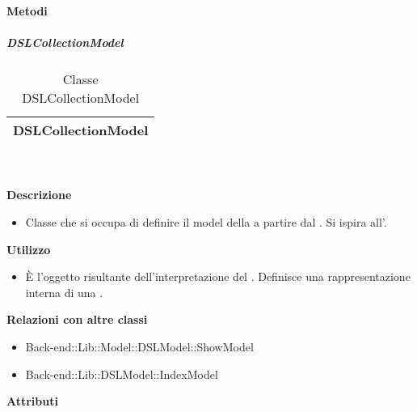 		\textbf{Metodi} 
	\begin{itemize}
		\end{itemize}
			\subparagraph{DSLCollectionModel} 
\begin{table}[ht]
\begin{center}
\bgroup
	\setlength{\arrayrulewidth}{0.6mm}
	\def\arraystretch{1}
		\begin{tabular}{ | p{12cm} | }
				\hline  
					\centerline{\textbf{DSLCollectionModel}}
		\\ \hline 
				\hline
				\hline
		
		\end{tabular}
\egroup
\caption{Classe DSLCollectionModel}
\end{center}
\end{table}  \textbf{\\ \\ Descrizione} 
					\begin{itemize}
						\item[] Classe che si occupa di definire il model della  a partire dal . Si ispira all'.
					\end{itemize}      
				\textbf{Utilizzo}  
					\begin{itemize}
						\item[] È l'oggetto risultante dell'interpretazione del . Definisce una rappresentazione interna di una .
					\end{itemize}
					\textbf{Relazioni con altre classi}
					\begin{itemize}
							\item{Back-end::Lib::Model::DSLModel::ShowModel}
							\item{Back-end::Lib::DSLModel::IndexModel}
					\end{itemize}
			 \textbf{Attributi} 
	\begin{itemize}
		\end{itemize}
		
